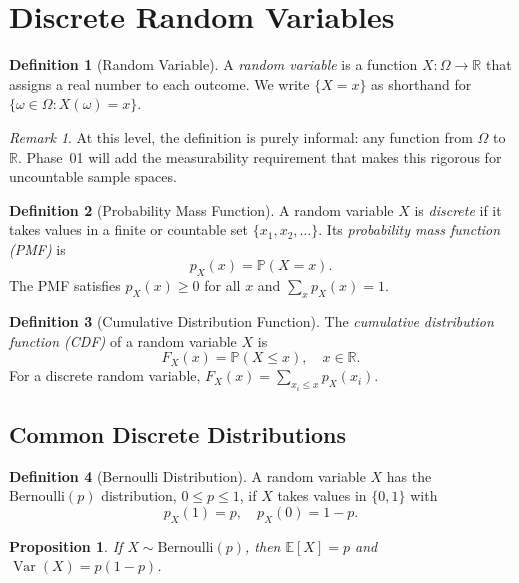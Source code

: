\documentclass[11pt,a4paper]{article}
\theoremstyle{definition}
\newtheorem{definition}{Definition}[section]
\theoremstyle{plain}
\newtheorem{proposition}[theorem]{Proposition}
\theoremstyle{remark}
\newtheorem{remark}{Remark}[section]
\newcommand{\R}{\mathbb{R}}
\newcommand{\E}{\mathbb{E}}
\newcommand{\Prob}{\mathbb{P}}
\DeclareMathOperator{\Var}{Var}
\begin{document}
\section{Discrete Random Variables}
\label{sec:discrete_rv}

\begin{definition}[Random Variable]
\label{def:rv}
A \emph{random variable} is a function $X \colon \Omega \to \R$ that assigns a real number
to each outcome. We write $\{X = x\}$ as shorthand for $\{\omega \in \Omega : X(\omega) = x\}$.
\end{definition}

\begin{remark}
At this level, the definition is purely informal: any function from $\Omega$ to $\R$.
Phase~01 will add the measurability requirement that makes this rigorous for uncountable
sample spaces.
\end{remark}

\begin{definition}[Probability Mass Function]
\label{def:pmf}
A random variable $X$ is \emph{discrete} if it takes values in a finite or countable set
$\{x_1, x_2, \ldots\}$. Its \emph{probability mass function (PMF)} is
\[
    p_X(x) = \Prob(X = x).
\]
The PMF satisfies $p_X(x) \geq 0$ for all $x$ and $\sum_x p_X(x) = 1$.
\end{definition}

\begin{definition}[Cumulative Distribution Function]
\label{def:cdf}
The \emph{cumulative distribution function (CDF)} of a random variable $X$ is
\[
    F_X(x) = \Prob(X \leq x), \quad x \in \R.
\]
For a discrete random variable, $F_X(x) = \sum_{x_i \leq x} p_X(x_i)$.
\end{definition}

\subsection{Common Discrete Distributions}

\begin{definition}[Bernoulli Distribution]
\label{def:bernoulli}
A random variable $X$ has the $\mathrm{Bernoulli}(p)$ distribution, $0 \leq p \leq 1$, if
$X$ takes values in $\{0, 1\}$ with
\[
    p_X(1) = p, \quad p_X(0) = 1 - p.
\]
\end{definition}

\begin{proposition}
\label{prop:bernoulli_moments}
If $X \sim \mathrm{Bernoulli}(p)$, then $\E[X] = p$ and $\Var(X) = p(1-p)$.
\end{proposition}
\end{document}
